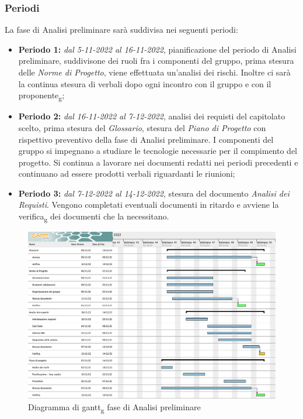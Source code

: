 \subsubsection{Periodi}
La fase di Analisi preliminare sarà suddivisa nei seguenti periodi:
\begin{itemize}
\item \textbf{Periodo 1:} \textit{dal 5-11-2022 al 16-11-2022},  pianificazione del periodo di Analisi preliminare,  suddivisone dei ruoli fra i componenti del gruppo,  prima stesura delle \textit{Norme di Progetto}, viene effettuata un'analisi dei rischi.  Inoltre ci sarà la continua stesura di verbali dopo ogni incontro con il gruppo e con il proponente\textsubscript{g};
\item \textbf{Periodo 2:} \textit{dal 16-11-2022 al 7-12-2022},  analisi dei requisti del capitolato scelto,  prima stesura del \textit{Glossario}, stesura del \textit{Piano di Progetto} con rispettivo preventivo della fase di Analisi preliminare.  I componenti del gruppo si impegnano a studiare le tecnologie necessarie per il compimento del progetto. Si continua a lavorare nei documenti redatti nei periodi precedenti e continuano ad essere prodotti verbali riguardanti le riunioni;
\item \textbf{Periodo 3: } \textit{dal 7-12-2022 al 14-12-2022}, stesura del documento \textit{Analisi dei Requisti}. Vengono completati eventuali documenti in ritardo e avviene la verifica\textsubscript{g} dei documenti che la necessitano.
\end{itemize}

\begin{figure}[H]
    \centering
    \includegraphics[scale=0.38]{image/analisi_preliminare_gantt.png}
    \caption{Diagramma di gantt\textsubscript{g} fase di Analisi preliminare}
\end{figure}
\pagebreak

